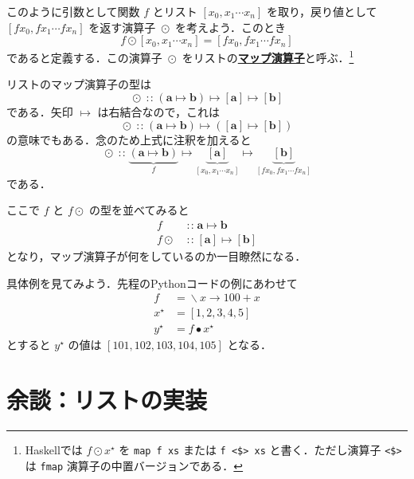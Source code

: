 \documentclass[a4paper,twocolumn]{jsbook}
\newcommand{\programminglanguage}[1]{\textsf{#1}}
\newcommand{\haskell}{\programminglanguage{Haskell}}
\newcommand{\python}{\programminglanguage{Python}}
\newcommand{\keyword}[1]{{\underline{\textbf{#1}}}}
\newcommand{\code}[1]{\texttt{#1}}
\DeclareMathOperator{\mIn}{{:\!:}}
\DeclareMathOperator{\mLambda}{\backslash}
\DeclareMathOperator{\mLambdaArrow}{\rightarrow}
\DeclareMathOperator{\mMap}{\bullet}
\DeclareMathOperator{\mMapList}{\odot}
\DeclareMathOperator{\mMapsTo}{\mapsto}
\newcommand{\mType}[1]{\mathbf{#1}}
\newcommand{\mListType}[1]{[\mType{#1}]}
\newcommand{\mListWith}[1]{\left[#1\right]}
\newcommand{\mList}[1]{{#1}^\mathrm{\star}}
\newcommand{\mLambdaExp}[2]{\mLambda{#1}\mLambdaArrow{#2}}
\newcommand{\mProj}[2]{#1\mMapsTo#2}
\begin{document}
このように引数として関数 $f$ とリスト $\mListWith{x_0,x_1\dotsb x_n}$ を取り，戻り値として $\mListWith{fx_0,fx_1\dotsb fx_n}$ を返す演算子 $\mMapList$ を考えよう．このとき
\begin{equation}
f\mMapList\mListWith{x_0,x_1\dotsb x_n}
=\mListWith{fx_0,fx_1\dotsb fx_n}
\end{equation}
であると定義する．この演算子 $\mMapList$ をリストの\keyword{マップ演算子}と呼ぶ．\footnote{\haskell では $f\mMapList\mList{x}$ を \code{map f xs} または \code{f <\$> xs} と書く．ただし演算子 \code{<\$>} は \code{fmap} 演算子の中置バージョンである．}

リストのマップ演算子の型は
\begin{equation}
\mMapList
\mIn{}
\mProj{
  (\mProj{\mType{a}}{\mType{b}})
}
{
  \mProj{\mListType{a}}{\mListType{b}}
}
\end{equation}
である．矢印 $\mMapsTo$ は右結合なので，これは
\begin{equation}
\mMapList
\mIn{}
\mProj{
  (\mProj{\mType{a}}{\mType{b}})
}
{
  (\mProj{\mListType{a}}{\mListType{b}})
}
\end{equation}
の意味でもある．念のため上式に注釈を加えると
\begin{equation}
\mMapList\mIn
\underbrace{\left(\mType{a}\mMapsTo\mType{b}\right)}_f
\mMapsTo
\underbrace{\mListType{a}}_{\mListWith{x_0,x_1\dotsb x_n}}
\mMapsTo
\underbrace{\mListType{b}}_{\mListWith{fx_0,fx_1\dotsb fx_n}}
\end{equation}
である．

ここで $f$ と $f\mMapList$ の型を並べてみると
\begin{align}
f&\mIn\mProj{\mType{a}}{\mType{b}}\\
f\mMapList&\mIn{}\mProj{\mListType{a}}{\mListType{b}}
\end{align}
となり，マップ演算子が何をしているのか一目瞭然になる．

具体例を見てみよう．先程の\python コードの例にあわせて
\begin{align}
f&=\mLambdaExp{x}{100+x}\\
\mList{x}&=\mListWith{1,2,3,4,5}\\
\mList{y}&=f\mMap\mList{x}
\end{align}
とすると $\mList{y}$ の値は $\mListWith{101,102,103,104,105}$ となる．

\section{余談：リストの実装}
\end{document}
